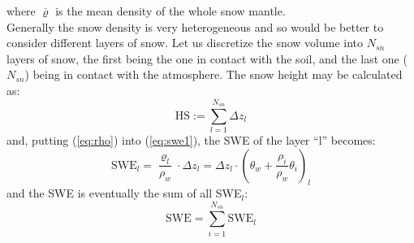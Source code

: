 \noindent where $\overline \varrho$ is the mean density of the whole snow mantle. \\
Generally the snow density is very heterogeneous and so would be better to consider different layers of snow.
Let us discretize the snow volume into $N_{sn}$ layers of snow, the first being the one in contact with the soil, and the last one ($N_{sn}$) being in contact with the atmosphere. The snow height may be calculated as:
%
\begin{equation}
\textrm{HS}:= \sum_{l=1}^{N_{sn}} \Delta z_l
\end{equation}
and, putting (\ref{eq:rho}) into (\ref{eq:swe1}), the SWE of the layer ``l'' becomes:
\begin{equation}\label{eq:swe2}
\textrm{SWE}_l=\frac{\varrho_l}{\rho_w} \cdot  \Delta z_l = \Delta z_l \cdot \left(\theta_w+ \frac{\rho_i}{\rho_w}  \theta_i  \right)_l
\end{equation}
and the SWE is eventually the sum of all SWE$_l$:
\begin{equation}
\textrm{SWE}= \sum_{i=1}^{N_{sn}} \textrm{SWE}_l
\end{equation}



